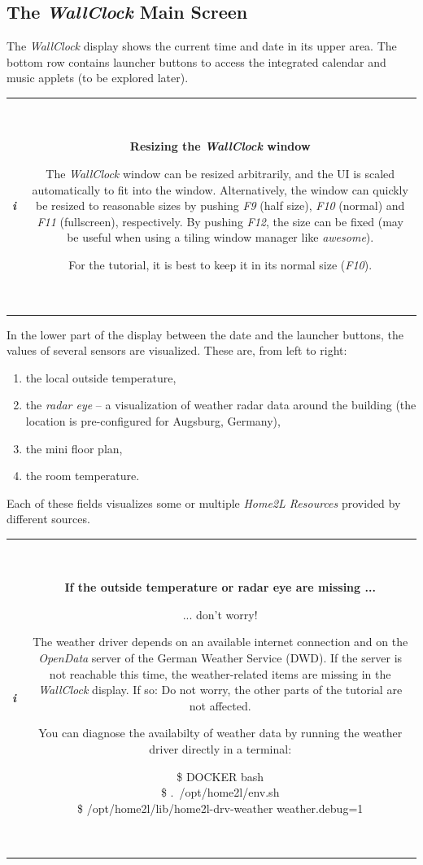 \documentclass[12pt,english,parskip=half,headheight=19pt]{scrreprt}
\newcommand{\lstbox}[1]{
  \par
  \colorbox{lstbackground}{\ttfamily\footnotesize{\parbox{\linewidth}{#1}}}
  \par
}
\newcommand{\infobox}[1]{
  \par
  \medskip
  \hfill
  \setlength\arrayrulewidth{1pt}
  \begin{tabular}[t]{c|c|}
    \parbox{1.8em}{\hfill\textit{\Huge\textbf{i}\,}}
    &
    \,\parbox{0.89\linewidth}{\setlength{\parskip}{0.5em} \small #1}\,
  \end{tabular}
  \medskip
  \par
}
\begin{document}
\subsection{The \textit{WallClock} Main Screen}
\label{sec:tutorial-firststeps-wallclock}

The \textit{WallClock} display shows the current time and date in its upper area. The bottom row contains launcher buttons to access the integrated calendar and music applets (to be explored later).

\infobox{
  \textbf{Resizing the \textit{WallClock} window}

  The \textit{WallClock} window can be resized arbitrarily, and the UI is scaled automatically
  to fit into the window. Alternatively, the window can quickly be resized to
  reasonable sizes by pushing \textit{F9} (half size), \textit{F10} (normal) and
  \textit{F11} (fullscreen), respectively. By pushing \textit{F12}, the size can be fixed
  (may be useful when using a tiling window manager like \textit{awesome}).

  For the tutorial, it is best to keep it in its normal size (\textit{F10}).
}

In the lower part of the display between the date and the launcher buttons, the values of several sensors are visualized. These are, from left to right:

\begin{enumerate}
  \item the local outside temperature,
  \item the \textit{radar eye} -- a visualization of weather radar data around the building
    (the location is pre-configured for Augsburg, Germany),
  \item the mini floor plan,
  \item the room temperature.
\end{enumerate}

Each of these fields visualizes some or multiple \textit{Home2L Resources} provided by different sources.

\infobox{
  \textbf{If the outside temperature or radar eye are missing ...}

  ... don't worry!

  The weather driver depends on an available internet connection and on the \textit{OpenData} server of
  the German Weather Service (DWD). If the server is not reachable this time, the weather-related items
  are missing in the \textit{WallClock} display.
  If so: Do not worry, the other parts of the tutorial are not affected.

  You can diagnose the availabilty of weather data by running the weather driver directly
  in a terminal:
  \lstbox{
    \$ DOCKER bash \\
    \$ .~/opt/home2l/env.sh \\
    \$ /opt/home2l/lib/home2l-drv-weather weather.debug=1
  }
}
\end{document}
